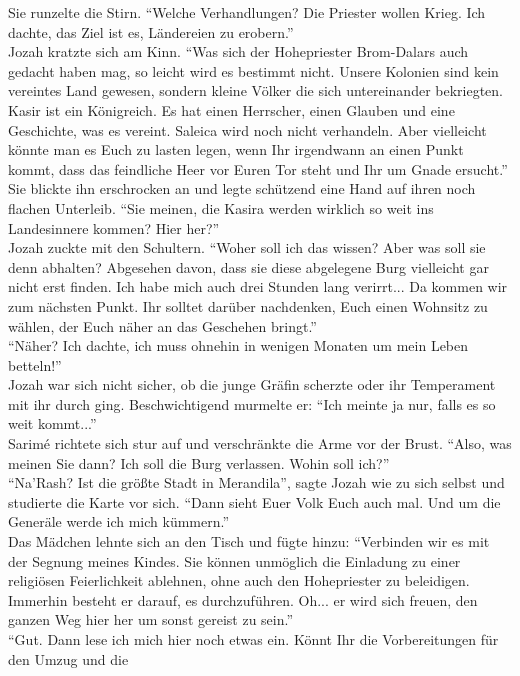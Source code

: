 Sie runzelte die Stirn. ``Welche Verhandlungen? Die Priester wollen Krieg. Ich dachte, das Ziel ist 
es, Ländereien zu erobern.''\\
Jozah kratzte sich am Kinn. ``Was sich der Hohepriester Brom-Dalars auch gedacht haben mag, so 
leicht wird es bestimmt nicht. Unsere Kolonien sind kein vereintes Land gewesen, sondern kleine 
Völker die sich untereinander bekriegten. Kasir ist ein Königreich. Es hat einen Herrscher, 
einen Glauben und eine Geschichte, was es vereint. Saleica wird noch nicht verhandeln. Aber 
vielleicht könnte man es Euch zu lasten legen, wenn Ihr irgendwann an einen Punkt kommt, dass das 
feindliche Heer vor Euren Tor steht und Ihr um Gnade ersucht.''\\
Sie blickte ihn erschrocken an und legte schützend eine Hand auf ihren noch flachen Unterleib. 
``Sie meinen, die Kasira werden wirklich so weit ins Landesinnere kommen? Hier her?''\\
Jozah zuckte mit den Schultern. ``Woher soll ich das wissen? Aber was soll sie denn abhalten? 
Abgesehen davon, dass sie diese abgelegene Burg vielleicht gar nicht erst finden. Ich habe mich 
auch drei Stunden lang verirrt... Da kommen wir zum nächsten Punkt. Ihr solltet darüber nachdenken, 
Euch einen Wohnsitz zu wählen, der Euch näher an das Geschehen bringt.''\\
``Näher? Ich dachte, ich muss ohnehin in wenigen Monaten um mein Leben betteln!''\\
Jozah war sich nicht sicher, ob die junge Gräfin scherzte oder ihr Temperament mit ihr durch ging. 
Beschwichtigend murmelte er: ``Ich meinte ja nur, falls es so weit kommt...''\\
Sarimé richtete sich stur auf und verschränkte die Arme vor der Brust. ``Also, was meinen Sie dann? 
Ich soll die Burg verlassen. Wohin soll ich?''\\
``Na'Rash? Ist die größte Stadt in Merandila'', sagte Jozah wie zu sich selbst und studierte die 
Karte vor sich. ``Dann sieht Euer Volk Euch auch mal. Und um die Generäle werde ich mich 
kümmern.''\\
Das Mädchen lehnte sich an den Tisch und fügte hinzu: ``Verbinden wir es mit der Segnung meines 
Kindes. Sie können unmöglich die Einladung zu einer religiösen Feierlichkeit ablehnen, ohne auch 
den Hohepriester zu beleidigen. Immerhin besteht er darauf, es durchzuführen. Oh... er wird sich 
freuen, den ganzen Weg hier her um sonst gereist zu sein.''\\
``Gut. Dann lese ich mich hier noch etwas ein. Könnt Ihr die Vorbereitungen für den Umzug und die 
